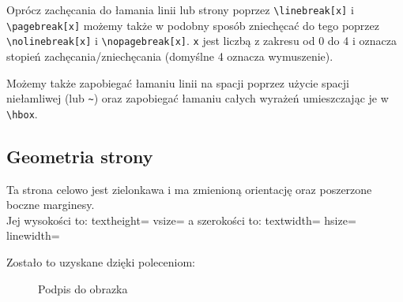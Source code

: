 \documentclass[fontSize=10pt,extra]{pdfArticle}
\begin{document}
Oprócz zachęcania do łamania linii lub strony poprzez \Verb$\linebreak[x]$ i \Verb$\pagebreak[x]$ możemy także w podobny sposób zniechęcać do tego poprzez \Verb$\nolinebreak[x]$ i \Verb$\nopagebreak[x]$.
\Verb$x$ jest liczbą z zakresu od 0 do 4 i oznacza stopień zachęcania/zniechęcania (domyślne 4 oznacza wymuszenie).

Możemy także zapobiegać łamaniu linii na spacji poprzez użycie spacji niełamliwej (lub \Verb$~$) oraz zapobiegać łamaniu całych wyrażeń umieszczając je w \Verb#\hbox#.

\begin{CatchExample}
\pagecolor[rgb]{0.9,1,0.9}
\end{CatchExample}
\putExampleTeX

\subsection{Geometria strony}

Ta strona celowo jest zielonkawa i ma zmienioną orientację oraz poszerzone boczne marginesy.\\
Jej wysokości to: textheight=\the\textheight{} vsize=\the\vsize{}
a szerokości to: textwidth=\the\textwidth{} hsize=\the\hsize{} linewidth=\the\linewidth{}

Zostało to uzyskane dzięki poleceniom: \putExampleVerbatimAdjust


\begin{CatchExample}
\begin{wrapfigure}{r}{6cm}
  \begin{center}
    \caption[Opcjonalny skrócony opis do spisu obrazków]{Podpis do obrazka} %
    \label{etykietka_obrazka} %
  \end{center}
\end{wrapfigure}
\end{CatchExample}
\putExampleTeX
\end{document}
